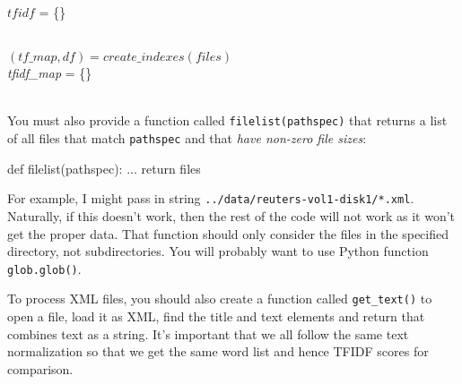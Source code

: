 \begin{fullwidth}
\begin{function}
\vspace{-4pt}
\Indp
	$tfidf$ = \{\}\\
	 \\
\end{function}

\begin{function}
\vspace{-4pt}
\Indp
	$(tf\_map, df) = create\_indexes(files)$\\
	{\em tfidf\_map} = \{\}\\
	 \\
\end{function}

You must also provide a function called {\tt filelist(pathspec)} that returns a list of all files that match {\tt pathspec} and that {\em  have non-zero file sizes}:

\begin{pyverbatim}
def filelist(pathspec):
    ...
    return files
\end{pyverbatim}
	
For example, I might pass in string {\tt\small ../data/reuters-vol1-disk1/*.xml}. Naturally, if this doesn't work, then the rest of the code will not work as it won't get the proper data.  That function should only consider the files in the specified directory, not subdirectories.  You will probably want to use Python function {\tt glob.glob()}.

To process XML files, you should also create a function called {\tt get\_text()} to open a file, load it as XML, find the title and text elements and return that combines text as a string. It's important that we all follow the same text normalization so that we get the same word list and hence TFIDF scores for comparison.


\end{fullwidth}
